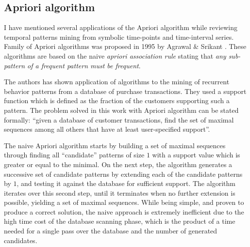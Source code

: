 \subsection{Apriori algorithm}\label{apriori}
I have mentioned several applications of the Apriori algorithm while reviewing temporal patterns mining from symbolic time-points and time-interval series. Family of Apriori algorithms was proposed in 1995 by Agrawal \& Srikant \cite{citeulike:775528}. These algorithms are based on the naive \textit{apriori association rule} stating that \textit{any sub-pattern of a frequent pattern must be frequent}. 

The authors has shown application of algorithms to the mining of recurrent behavior patterns from a database of purchase transactions. They used a support function which is defined as the fraction of the customers supporting such a pattern. The problem solved in this work with Apriori algorithm can be stated formally: ``given a database of customer transactions, find the set of maximal sequences among all others that have at least user-specified support''.

The naive Apriori algorithm starts by building a set of maximal sequences through finding all ``candidate'' patterns of size $1$ with a support value which is greater or equal to the minimal. On the next step, the algorithm generates a successive set of candidate patterns by extending each of the candidate patterns by $1$, and testing it against the database for sufficient support. The algorithm iterates over this second step, until it terminates when no further extension is possible, yielding a set of maximal sequences. While being simple, and proven to produce a correct solution, the naive approach is extremely inefficient due to the high time cost of the database scanning phase, which is the product of a time needed for a single pass over the database and the number of generated candidates.


